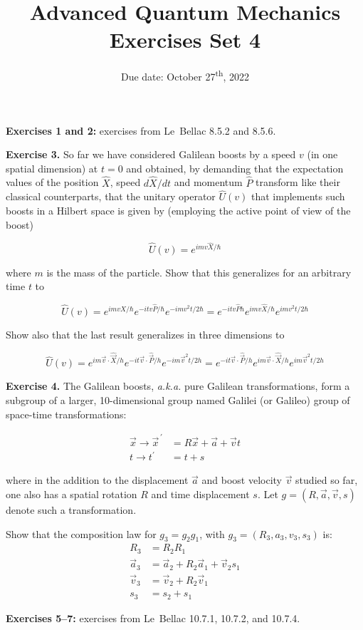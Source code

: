 \documentclass[12pt]{article}
\title{Advanced Quantum Mechanics\\Exercises Set 4\vspace{-0.5em}}
\date{Due date: October 27\textsuperscript{th}, 2022}
\begin{document}
\maketitle


\textbf{Exercises 1 and 2:} exercises from Le~Bellac 8.5.2 and 8.5.6.

\textbf{Exercise 3.}
 So far we have considered Galilean boosts by a speed \(v\) (in one spatial dimension)
at \(t=0\) and obtained, by demanding that the expectation values of the position \(\hat{X}\), speed
\(d \hat{X} / d t\) and momentum \(\hat{P}\) transform like their classical counterparts, that the unitary operator
\(\hat{U}(v)\) that implements such boosts in a Hilbert space is given by (employing the active point
of view of the boost)

\[\hat{U}(v)=e^{i m v \hat{X} / \hbar}\]

where \(m\) is the mass of the particle. Show that this generalizes for an arbitrary time \(t\) to

\[\hat{U}(v)=e^{i m v \hat{X} / \hbar} e^{-i t v \hat{P} / \hbar} e^{-i m v^{2} t / 2 \hbar}=e^{-i t v \hat{P} h} e^{i m v \hat{X} / \hbar} e^{i m v^{2} t / 2 \hbar}\]

Show also that the last result generalizes in three dimensions to

\[\hat{U}(v)=e^{i m \vec{v} \cdot \hat{\vec{X}} / h} e^{-i t \vec{v} \cdot \hat{\vec{P}} / h} e^{-i m \vec{v}^{2} t / 2 h}=e^{-i t \vec{v} \cdot \hat{\vec{P}} / h} e^{i m \vec{v} \cdot \hat{\vec{X}} / h} e^{i m \vec{v}^{2} t / 2 h}\]

\textbf{Exercise 4.} The Galilean boosts, \textit{a.k.a.} pure Galilean transformations, form a subgroup of a
larger, 10-dimensional group named Galilei (or Galileo) group of space-time transformations:

\[
\begin{aligned}
\vec{x} \rightarrow \vec{x}^{\,\prime}&=R \vec{x}+\vec{a}+\vec{v} t \\ 
t \rightarrow t^{\prime}&=t+s
\end{aligned}
\]

where in the addition to the displacement \(\vec{a}\) and boost velocity \(\vec{v}\) studied so far, one also has
a spatial rotation \(R\) and time displacement \(s\). Let \(g=(R, \vec{a}, \vec{v}, s)\) denote such a transformation.

Show that the composition law for \(g_{3}=g_{2} g_{1}\), with \(g_{3}=\left(R_{3}, a_{3}, v_{3}, s_{3}\right)\) is:
\[
\begin{aligned} 
R_{3} &=R_{2} R_{1} \\ 
\vec{a}_{3} &=\vec{a}_{2}+R_{2} \vec{a}_{1}+\vec{v}_{2} s_{1} \\ 
\vec{v}_{3} &=\vec{v}_{2}+R_{2} \vec{v}_{1} \\ 
s_{3} &=s_{2}+s_{1} 
\end{aligned}
\]

\textbf{Exercises 5--7:} exercises from Le~Bellac 10.7.1, 10.7.2, and 10.7.4.
\end{document}
